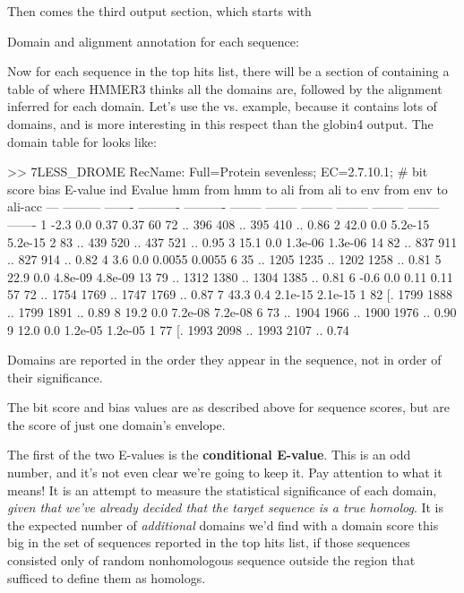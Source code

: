 Then comes the third output section, which starts with

\begin{sreoutput}
Domain and alignment annotation for each sequence:
\end{sreoutput}

Now for each sequence in the top hits list, there will be a section of
containing a table of where HMMER3 thinks all the domains are,
followed by the alignment inferred for each domain. Let's use the
 vs.  example, because it contains lots
of domains, and is more interesting in this respect than the globin4
output.  The domain table for  looks like:

\begin{sreoutput}
>> 7LESS_DROME  RecName: Full=Protein sevenless;          EC=2.7.10.1;
     # bit score    bias    E-value ind Evalue hmm from   hmm to    ali from   ali to    env from   env to    ali-acc
   --- --------- ------- ---------- ---------- -------- --------    -------- --------    -------- --------    -------
     1      -2.3     0.0       0.37       0.37       60       72 ..      396      408 ..      395      410 ..    0.86
     2      42.0     0.0    5.2e-15    5.2e-15        2       83 ..      439      520 ..      437      521 ..    0.95
     3      15.1     0.0    1.3e-06    1.3e-06       14       82 ..      837      911 ..      827      914 ..    0.82
     4       3.6     0.0     0.0055     0.0055        6       35 ..     1205     1235 ..     1202     1258 ..    0.81
     5      22.9     0.0    4.8e-09    4.8e-09       13       79 ..     1312     1380 ..     1304     1385 ..    0.81
     6      -0.6     0.0       0.11       0.11       57       72 ..     1754     1769 ..     1747     1769 ..    0.87
     7      43.3     0.4    2.1e-15    2.1e-15        1       82 [.     1799     1888 ..     1799     1891 ..    0.89
     8      19.2     0.0    7.2e-08    7.2e-08        6       73 ..     1904     1966 ..     1900     1976 ..    0.90
     9      12.0     0.0    1.2e-05    1.2e-05        1       77 [.     1993     2098 ..     1993     2107 ..    0.74
\end{sreoutput}

Domains are reported in the order they appear in the sequence, not in
order of their significance.

The bit score and bias values are as described above for sequence
scores, but are the score of just one domain's envelope. 

The first of the two E-values is the \textbf{conditional
E-value}. This is an odd number, and it's not even clear we're going
to keep it. Pay attention to what it means! It is an attempt to
measure the statistical significance of each domain, \emph{given that
we've already decided that the target sequence is a true homolog}.  It
is the expected number of \emph{additional} domains we'd find with a
domain score this big in the set of sequences reported in the top hits
list, if those sequences consisted only of random nonhomologous
sequence outside the region that sufficed to define them as homologs. 

